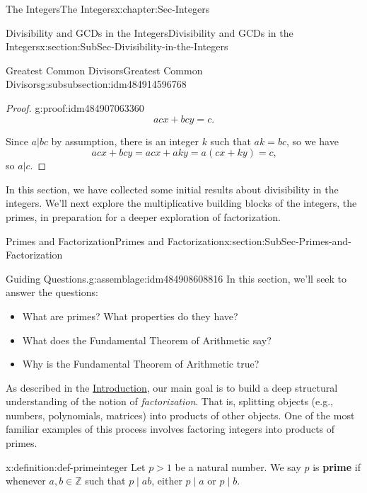 \documentclass[oneside,10pt,]{book}
\newcommand{\terminology}[1]{\textbf{#1}}
\numberwithin{equation}{section}
\def\Z{{\mathbb Z}}
\begin{document}
\begin{chapterptx}{The Integers}{}{The Integers}{}{}{x:chapter:Sec-Integers}
\begin{sectionptx}{Divisibility and GCDs in the Integers}{}{Divisibility and GCDs in the Integers}{}{}{x:section:SubSec-Divisibility-in-the-Integers}
\begin{subsubsectionptx}{Greatest Common Divisors}{}{Greatest Common Divisors}{}{}{g:subsubsection:idm484914596768}
\begin{proof}{}{g:proof:idm484907063360}
\begin{equation*}
acx + bcy = c\text{.}
\end{equation*}
%
\par
Since \(a|bc\) by assumption, there is an integer \(k\) such that \(ak = bc\), so we have%
\begin{equation*}
acx + bcy = acx + aky = a(cx+ky) = c\text{,}
\end{equation*}
so \(a|c\).%
\end{proof}
\end{subsubsectionptx}
\begin{conclusion}{}%
In this section, we have collected some initial results about divisibility in the integers. We'll next explore the multiplicative building blocks of the integers, the primes, in preparation for a deeper exploration of factorization.%
\end{conclusion}%
\end{sectionptx}
%
%
\typeout{************************************************}
\typeout{************************************************}
%
\begin{sectionptx}{Primes and Factorization}{}{Primes and Factorization}{}{}{x:section:SubSec-Primes-and-Factorization}
\begin{assemblage}{Guiding Questions.}{g:assemblage:idm484908608816}%
In this section, we'll seek to answer the questions: %
\begin{itemize}[label=\textbullet]
\item{}What are primes? What properties do they have?%
\item{}What does the Fundamental Theorem of Arithmetic say?%
\item{}Why is the Fundamental Theorem of Arithmetic true?%
\end{itemize}
%
\end{assemblage}
As described in the \hyperref[x:preface:Sec-Introduction]{Introduction}, our main goal is to build a deep structural understanding of the notion of \emph{factorization}. That is, splitting objects (e.g., numbers, polynomials, matrices) into products of other objects. One of the most familiar examples of this process involves factoring integers into products of primes.%
\begin{definition}{}{x:definition:def-primeinteger}%
%
%
Let \(p > 1\) be a natural number. We say \(p\) is \terminology{prime} if whenever \(a,b\in \Z\) such that \(p\mid ab\), either \(p\mid a\) or \(p\mid b\).%
\par

\end{definition}
\end{sectionptx}
\end{chapterptx}
\end{document}
